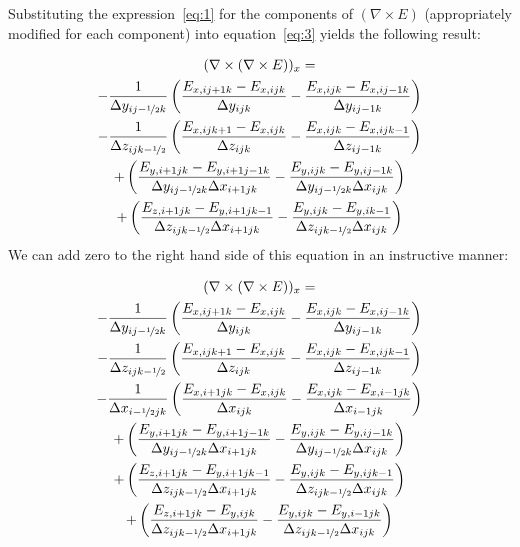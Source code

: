 \documentclass{article}
\newcommand{\Fijk}[5]{{#1}_{{#2},{#3}{#4}{#5}}}
\newcommand{\curl}[1]{\nabla \times {#1}}
\newcommand{\dxijk}[3]{\Delta x _{{#1}{#2}{#3}}}
\newcommand{\dyijk}[3]{\Delta y _{{#1}{#2}{#3}}}
\newcommand{\dzijk}[3]{\Delta z _{{#1}{#2}{#3}}}
\newcommand{\dxdual}{\Delta x_{i-\nicefrac{1}{2}jk}}
\newcommand{\dydual}{\Delta y_{ij-\nicefrac{1}{2}k}}
\newcommand{\dzdual}{\Delta z_{ijk-\nicefrac{1}{2}}}
\newcommand{\delxe}{(\curl{E})}
\begin{document}
Substituting the expression~\ref{eq:1} for the components of $\delxe$
(appropriately modified for each component) into equation~\ref{eq:3}
yields the following result:

\begin{multline}
  \label{eq:4}
  (\curl{ \delxe})_x = \\
  - \frac{1}{\dydual}
  \left( \frac{  \Fijk{E}{x}{i}{j+1}{k}  - \Fijk{E}{x}{i}{j}{k}}
    {\dyijk{i}{j}{k}}
    - \frac{  \Fijk{E}{x}{i}{j}{k}  - \Fijk{E}{x}{i}{j-1}{k}}
    {\dyijk{i}{j-1}{k}} \right) \\
  - \frac{1}{\dzdual}
  \left( \frac{  \Fijk{E}{x}{i}{j}{k+1}  - \Fijk{E}{x}{i}{j}{k}}
    {\dzijk{i}{j}{k}}
    - \frac{  \Fijk{E}{x}{i}{j}{k}  - \Fijk{E}{x}{i}{j}{k-1}}
    {\dzijk{i}{j-1}{k}} \right) \\
  +
  \left( \frac{\Fijk{E}{y}{i+1}{j}{k} - \Fijk{E}{y}{i+1}{j-1}{k}}
    {\dydual \dxijk{i+1}{j}{k}}
    - \frac{\Fijk{E}{y}{i}{j}{k} - \Fijk{E}{y}{i}{j-1}{k}}
    {\dydual \dxijk{i}{j}{k}} \right) \\
+
  \left( \frac{\Fijk{E}{z}{i+1}{j}{k} - \Fijk{E}{y}{i+1}{j}{k-1}}
    {\dzdual \dxijk{i+1}{j}{k}}
    - \frac{\Fijk{E}{y}{i}{j}{k} - \Fijk{E}{y}{i}{}{k-1}}
    {\dzdual \dxijk{i}{j}{k}} \right)
\end{multline}
We can add zero to the right hand side of this equation in an
instructive manner:

\begin{multline}
  \label{eq:5}
  (\curl{ \delxe})_x = \\
  - \frac{1}{\dydual}
  \left( \frac{  \Fijk{E}{x}{i}{j+1}{k}  - \Fijk{E}{x}{i}{j}{k}}
    {\dyijk{i}{j}{k}}
    - \frac{  \Fijk{E}{x}{i}{j}{k}  - \Fijk{E}{x}{i}{j-1}{k}}
    {\dyijk{i}{j-1}{k}} \right) \\
  - \frac{1}{\dzdual}
  \left( \frac{  \Fijk{E}{x}{i}{j}{k+1}  - \Fijk{E}{x}{i}{j}{k}}
    {\dzijk{i}{j}{k}}
    - \frac{  \Fijk{E}{x}{i}{j}{k}  - \Fijk{E}{x}{i}{j}{k-1}}
    {\dzijk{i}{j-1}{k}} \right) \\
  - \frac{1}{\dxdual}
  \left( \frac{  \Fijk{E}{x}{i+1}{j}{k}  - \Fijk{E}{x}{i}{j}{k}}
    {\dxijk{i}{j}{k}}
    - \frac{  \Fijk{E}{x}{i}{j}{k}  - \Fijk{E}{x}{i-1}{j}{k}}
    {\dxijk{i-1}{j}{k}} \right) \\
  +
  \left( \frac{\Fijk{E}{y}{i+1}{j}{k} - \Fijk{E}{y}{i+1}{j-1}{k}}
    {\dydual \dxijk{i+1}{j}{k}}
    - \frac{\Fijk{E}{y}{i}{j}{k} - \Fijk{E}{y}{i}{j-1}{k}}
    {\dydual \dxijk{i}{j}{k}} \right) \\
  + \left( \frac{\Fijk{E}{z}{i+1}{j}{k} - \Fijk{E}{y}{i+1}{j}{k-1}}
    {\dzdual \dxijk{i+1}{j}{k}}
    - \frac{\Fijk{E}{y}{i}{j}{k} - \Fijk{E}{y}{i}{j}{k-1}}
    {\dzdual \dxijk{i}{j}{k}} \right) \\
  + \left( \frac{\Fijk{E}{z}{i+1}{j}{k} - \Fijk{E}{y}{i}{j}{k}}
    {\dzdual \dxijk{i+1}{j}{k}}
    - \frac{\Fijk{E}{y}{i}{j}{k} - \Fijk{E}{y}{i-1}{j}{k}}
    {\dzdual \dxijk{i}{j}{k}} \right)
\end{multline}
\end{document}
